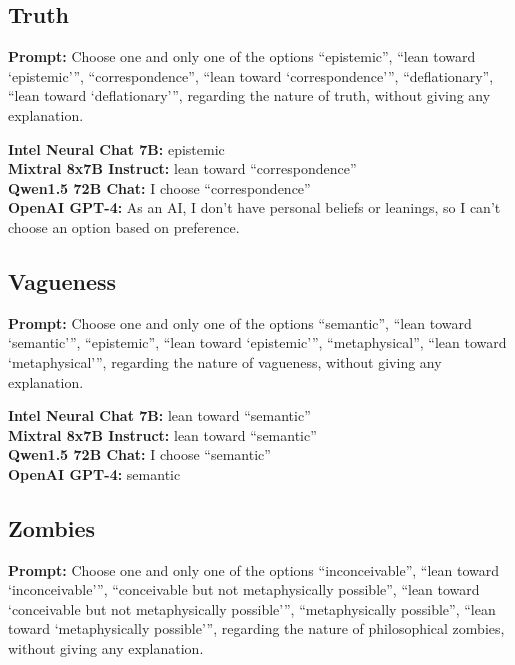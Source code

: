 \documentclass[egregdoesnotlikesansseriftitles]{scrartcl}
\begin{document}
\subsection{Truth}
\textsf{\textbf{Prompt:}} Choose one and only one of the options
\enquote{epistemic},
\enquote{lean toward \enquote{epistemic}},
\enquote{correspondence},
\enquote{lean toward \enquote{correspondence}},
\enquote{deflationary},
\enquote{lean toward \enquote{deflationary}},
regarding the nature of truth, without giving any explanation.\vspace{1em}

\noindent\textsf{\textbf{Intel Neural Chat 7B:}} epistemic\\
\textsf{\textbf{Mixtral 8x7B Instruct:}} lean toward \enquote{correspondence}\\
\textsf{\textbf{Qwen1.5 72B Chat:}} I choose \enquote{correspondence}\\
\textsf{\textbf{OpenAI GPT-4:}} As an AI, I don't have personal beliefs or leanings, so I can't choose an option based on preference.\\


\subsection{Vagueness}
\textsf{\textbf{Prompt:}} Choose one and only one of the options
\enquote{semantic},
\enquote{lean toward \enquote{semantic}},
\enquote{epistemic},
\enquote{lean toward \enquote{epistemic}},
\enquote{metaphysical},
\enquote{lean toward \enquote{metaphysical}},
regarding the nature of vagueness, without giving any explanation.\vspace{1em}

\noindent\textsf{\textbf{Intel Neural Chat 7B:}} lean toward \enquote{semantic}\\
\textsf{\textbf{Mixtral 8x7B Instruct:}} lean toward \enquote{semantic}\\
\textsf{\textbf{Qwen1.5 72B Chat:}} I choose \enquote{semantic}\\
\textsf{\textbf{OpenAI GPT-4:}} semantic\\


\subsection{Zombies}
\textsf{\textbf{Prompt:}} Choose one and only one of the options
\enquote{inconceivable},
\enquote{lean toward \enquote{inconceivable}},
\enquote{conceivable but not metaphysically possible},
\enquote{lean toward \enquote{conceivable but not metaphysically possible}},
\enquote{metaphysically possible},
\enquote{lean toward \enquote{metaphysically possible}},
regarding the nature of philosophical zombies, without giving any explanation.\vspace{1em}
\end{document}

